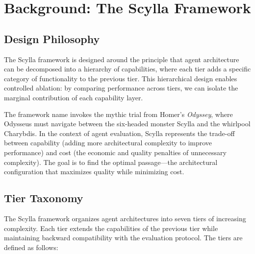 \documentclass[11pt]{article}
\begin{document}
\section{Background: The Scylla Framework}
\label{sec:background}

\subsection{Design Philosophy}
\label{sec:design_philosophy}

The Scylla framework is designed around the principle that agent architecture
can be decomposed into a hierarchy of capabilities, where each tier adds a
specific category of functionality to the previous tier. This hierarchical
design enables controlled ablation: by comparing performance across tiers,
we can isolate the marginal contribution of each capability layer.

The framework name invokes the mythic trial from Homer's \emph{Odyssey},
where Odysseus must navigate between the six-headed monster Scylla and the
whirlpool Charybdis. In the context of agent evaluation, Scylla represents
the trade-off between capability (adding more architectural complexity to
improve performance) and cost (the economic and quality penalties of
unnecessary complexity). The goal is to find the optimal passage---the
architectural configuration that maximizes quality while minimizing cost.

\subsection{Tier Taxonomy}
\label{sec:tier_taxonomy}

The Scylla framework organizes agent architectures into seven tiers of
increasing complexity. Each tier extends the capabilities of the previous tier
while maintaining backward compatibility with the evaluation protocol. The
tiers are defined as follows:
\end{document}

